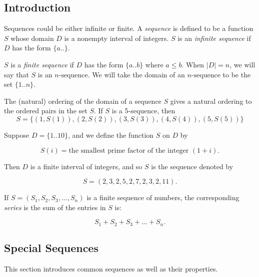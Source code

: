 \documentclass[
	12pt, %
	fleqn, %
	a4paper, %
]{LegrandOrangeBook}
\begin{document}
\subsection{Introduction}
Sequences could be either infinite or finite. A \textit{sequence} is defined to be a function \( S \) whose domain \( D \) is a nonempty interval of integers. \( S \) is an \textit{infinite sequence} if \( D \) has the form \( \{a..\} \). %

\( S \) is a \textit{finite sequence} if \( D \) has the form \( \{a..b\} \) where \( a \leq b \). When \( |D| = n \), we will say that \( S \) is an \( n\text{-sequence} \). We will take the domain of an \( n\text{-sequence} \) to be the set \( \{1..n\} \). %

The (natural) ordering of the domain of a sequence \( S \) gives a natural ordering to the ordered pairs in the set \( S \). If \( S \) is a 5-sequence, then
\[ S = \{(1, S(1)), (2, S(2)), (3, S(3)), (4, S(4)), (5, S(5))\} \]

\begin{example}
    Suppose \( D = \{1..10\} \), and we define the function \( S \) on \( D \) by

\[ S(i) = \text{the smallest prime factor of the integer } (1 + i). \]

Then \( D \) is a finite interval of integers, and so \( S \) is the sequence denoted by

\[ S = (2, 3, 2, 5, 2, 7, 2, 3, 2, 11). \]
\end{example}

\begin{definition}
    If \( S = (S_1, S_2, S_3, \ldots, S_n) \) is a finite sequence of numbers, the corresponding \textit{series} is the sum of the entries in \( S \)
    is:

\[ S_1 + S_2 + S_3 + \ldots + S_n. \]
\end{definition}
\subsection{Special Sequences}
This section introduces common sequences as well as their properties.
\end{document}
